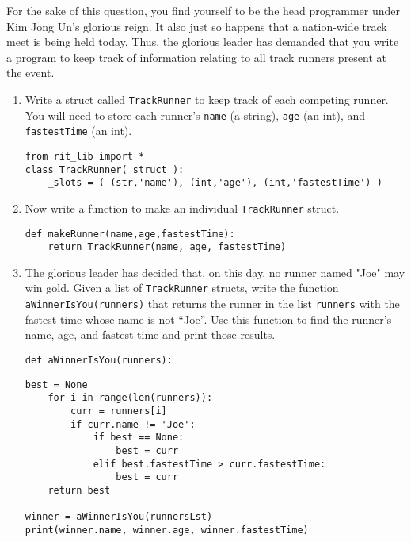 For the sake of this question, you find yourself to be the head programmer under Kim Jong Un's glorious reign.
It also just so happens that a nation-wide track meet is being held today. Thus, the glorious leader has demanded that
you write a program to keep track of information relating to all track runners present at the event.

\begin{enumerate}
\item Write a struct called \texttt{TrackRunner} to keep track of each competing runner.
You will need to store each runner's \texttt{name} (a string), \texttt{age} (an int), and \texttt{fastestTime} (an int).
\begin{answer}
\begin{lstlisting}[numbers=none]
from rit_lib import *
class TrackRunner( struct ):
    _slots = ( (str,'name'), (int,'age'), (int,'fastestTime') )

\end{lstlisting}
\end{answer}

\item Now write a function to make an individual \texttt{TrackRunner} struct.
\begin{answer}
\begin{lstlisting}[numbers=none]
def makeRunner(name,age,fastestTime):
    return TrackRunner(name, age, fastestTime)
\end{lstlisting}
\end{answer}

\item The glorious leader has decided that, on this day, no runner named "Joe" may win
gold. Given a list of \texttt{TrackRunner} structs, write the function \texttt{aWinnerIsYou(runners)} that returns the runner in the list \texttt{runners} with the fastest time whose name is not ``Joe''.
Use this function to find the runner's name, age, and fastest time and print those results.
\begin{lstlisting}[numbers=none]
def aWinnerIsYou(runners):
\end{lstlisting}
\begin{answer}
\begin{lstlisting}[numbers=none]
    best = None
    for i in range(len(runners)):
        curr = runners[i]
        if curr.name != 'Joe':
            if best == None:
                best = curr
            elif best.fastestTime > curr.fastestTime:
                best = curr
    return best

winner = aWinnerIsYou(runnersLst)
print(winner.name, winner.age, winner.fastestTime)
\end{lstlisting}
\end{answer}
\end{enumerate}
